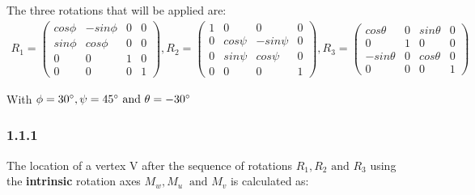 The three rotations that will be applied are:
\begin{align*}
R_1 = 
\begin{pmatrix}
cos\phi & -sin\phi & 0 & 0 \\
sin\phi & cos\phi & 0 & 0 \\
0 & 0 & 1 & 0 \\
0 & 0 & 0 & 1 
\end{pmatrix}, 
R_2 = 
\begin{pmatrix}
1 & 0 & 0 & 0 \\
0 & cos\psi & -sin\psi & 0 \\
0 & sin\psi & cos\psi & 0 \\
0 & 0 & 0 & 1 
\end{pmatrix}, 
R_3 = 
\begin{pmatrix}
cos\theta & 0 & sin\theta & 0 \\
0 & 1 & 0 & 0 \\
-sin\theta & 0 & cos\theta & 0 \\
0 & 0 & 0 & 1 
\end{pmatrix}
\end{align*}

With $\phi = 30\degree, \psi = 45\degree \text{ and } \theta = -30\degree$

\subsubsection*{1.1.1}

The location of a vertex V after the sequence of rotations $R_1, R_2 \text{ and } R_3$ using the \textbf{intrinsic} rotation axes $M_w, M_u\ \text{ and } M_v$ is calculated as:

